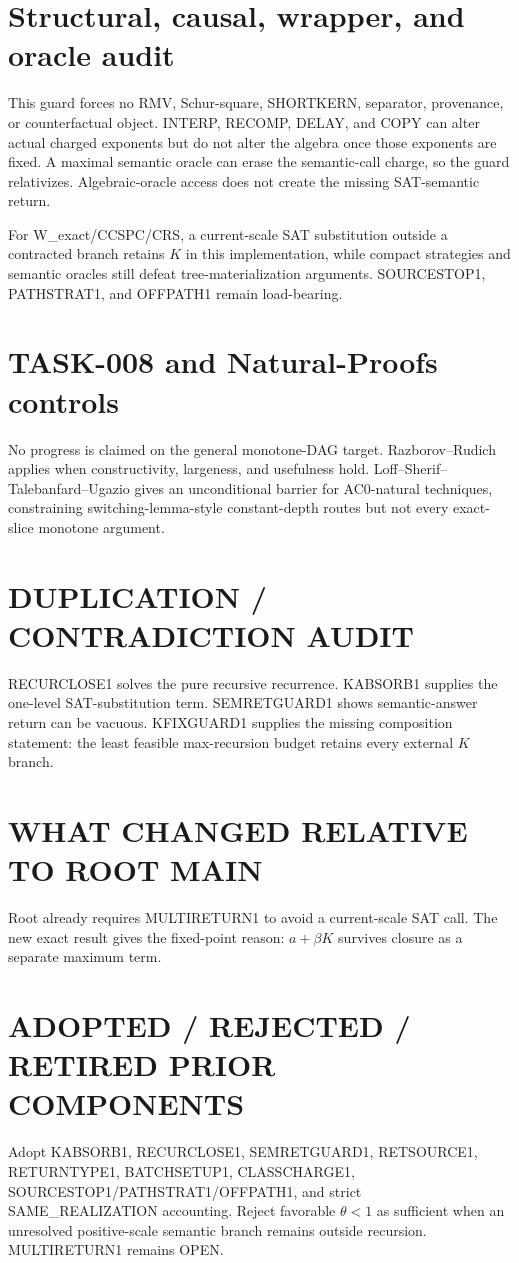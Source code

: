\documentclass[11pt]{article}
\begin{document}
\section*{Structural, causal, wrapper, and oracle audit}
This guard forces no RMV, Schur-square, SHORTKERN, separator, provenance, or counterfactual object. INTERP, RECOMP, DELAY, and COPY can alter actual charged exponents but do not alter the algebra once those exponents are fixed. A maximal semantic oracle can erase the semantic-call charge, so the guard relativizes. Algebraic-oracle access does not create the missing SAT-semantic return.

For W\_exact/CCSPC/CRS, a current-scale SAT substitution outside a contracted branch retains $K$ in this implementation, while compact strategies and semantic oracles still defeat tree-materialization arguments. SOURCESTOP1, PATHSTRAT1, and OFFPATH1 remain load-bearing.

\section*{TASK-008 and Natural-Proofs controls}
No progress is claimed on the general monotone-DAG target. Razborov--Rudich applies when constructivity, largeness, and usefulness hold. Loff--Sherif--Talebanfard--Ugazio gives an unconditional barrier for AC0-natural techniques, constraining switching-lemma-style constant-depth routes but not every exact-slice monotone argument.

\section*{DUPLICATION / CONTRADICTION AUDIT}
RECURCLOSE1 solves the pure recursive recurrence. KABSORB1 supplies the one-level SAT-substitution term. SEMRETGUARD1 shows semantic-answer return can be vacuous. KFIXGUARD1 supplies the missing composition statement: the least feasible max-recursion budget retains every external $K$ branch.

\section*{WHAT CHANGED RELATIVE TO ROOT MAIN}
Root already requires MULTIRETURN1 to avoid a current-scale SAT call. The new exact result gives the fixed-point reason: $a+\beta K$ survives closure as a separate maximum term.

\section*{ADOPTED / REJECTED / RETIRED PRIOR COMPONENTS}
Adopt KABSORB1, RECURCLOSE1, SEMRETGUARD1, RETSOURCE1, RETURNTYPE1, BATCHSETUP1, CLASSCHARGE1, SOURCESTOP1/PATHSTRAT1/OFFPATH1, and strict SAME\_REALIZATION accounting. Reject favorable $\theta<1$ as sufficient when an unresolved positive-scale semantic branch remains outside recursion. MULTIRETURN1 remains OPEN.
\end{document}
